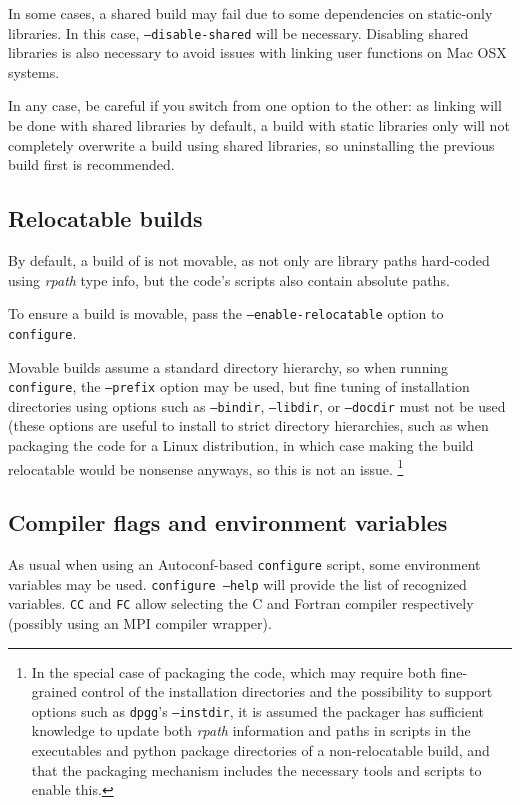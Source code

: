 \documentclass[a4paper,10pt,twoside]{csshortdoc}
\begin{document}
In some cases, a shared build may fail due to some dependencies
on static-only libraries. In this case, {\tt --disable-shared}
will be necessary. Disabling shared libraries is also necessary
to avoid issues with linking user functions on Mac OSX systems.

In any case, be careful if you switch from one option to the other: as
linking will be done with shared libraries by default, a build
with static libraries only will not completely overwrite a build using
shared libraries, so uninstalling the previous build first
is recommended.

\subsection{Relocatable builds\label{sec:config:relocatable}}

By default, a build of \CS is not movable, as not only
are library paths hard-coded using \emph{rpath} type info,
but the code's scripts also contain absolute paths.

To ensure a build is movable, pass the \texttt{--enable-relocatable} option
to {\tt configure}.

Movable builds assume a standard directory hierarchy, so when running
{\tt configure}, the \texttt{--prefix} option may be used, but fine tuning
of installation directories using options such as \texttt{--bindir},
\texttt{--libdir}, or \texttt{--docdir} must not be used
(these options are useful to install to strict directory hierarchies,
such as when packaging the code for a Linux distribution,
in which case making the build relocatable would be nonsense anyways,
so this is not an issue.
\footnote{In the special case of packaging the code, which
may require both fine-grained control of the installation directories
and the possibility to support options such as \texttt{dpgg}'s
\texttt{--instdir}, it is assumed the packager has sufficient knowledge to
update both \emph{rpath} information and paths in scripts in the executables
and python package directories of a non-relocatable build, and that the
packaging mechanism includes the necessary tools and scripts to enable this.}

\subsection{Compiler flags and environment variables\label{sec:config:flags}}

As usual when using an Autoconf-based \texttt{configure} script,
some environment variables may be used. \texttt{configure --help}
will provide the list of recognized variables.
\texttt{CC} and \texttt{FC} allow selecting the C and Fortran compiler
respectively (possibly using an MPI compiler wrapper).
\end{document}
